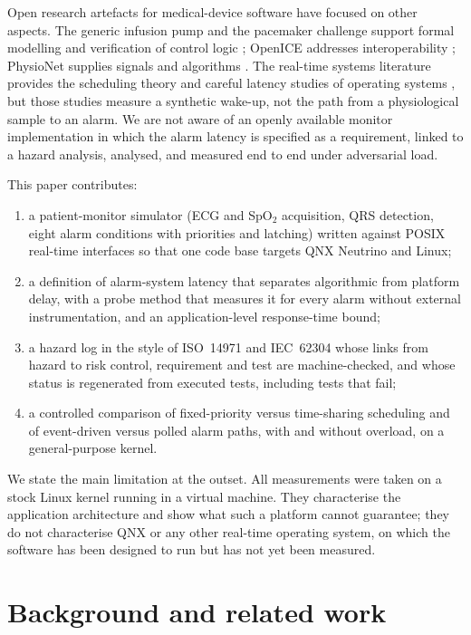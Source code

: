 \documentclass[preprint,3p,10pt]{elsarticle}
\begin{document}
Open research artefacts for medical-device software have focused on other aspects. The generic infusion pump and the pacemaker challenge support formal modelling and verification of control logic \cite{arney2007,kim2011,jiang2012}; OpenICE addresses interoperability \cite{arney2018}; PhysioNet supplies signals and algorithms \cite{goldberger2000,moody2001}. The real-time systems literature provides the scheduling theory \cite{liu1973,joseph1986,audsley1993,sha1990} and careful latency studies of operating systems \cite{cerqueira2013,bristot2020,reghenzani2019,adam2021}, but those studies measure a synthetic wake-up, not the path from a physiological sample to an alarm. We are not aware of an openly available monitor implementation in which the alarm latency is specified as a requirement, linked to a hazard analysis, analysed, and measured end to end under adversarial load.

This paper contributes:
\begin{enumerate}
\item a patient-monitor simulator (ECG and SpO$_2$ acquisition, QRS detection, eight alarm conditions with priorities and latching) written against POSIX real-time interfaces so that one code base targets QNX Neutrino and Linux;
\item a definition of alarm-system latency that separates algorithmic from platform delay, with a probe method that measures it for every alarm without external instrumentation, and an application-level response-time bound;
\item a hazard log in the style of ISO~14971 and IEC~62304 whose links from hazard to risk control, requirement and test are machine-checked, and whose status is regenerated from executed tests, including tests that fail;
\item a controlled comparison of fixed-priority versus time-sharing scheduling and of event-driven versus polled alarm paths, with and without overload, on a general-purpose kernel.
\end{enumerate}

We state the main limitation at the outset. All measurements were taken on a stock Linux kernel running in a virtual machine. They characterise the application architecture and show what such a platform cannot guarantee; they do not characterise QNX or any other real-time operating system, on which the software has been designed to run but has not yet been measured.

\section{Background and related work}
\end{document}
